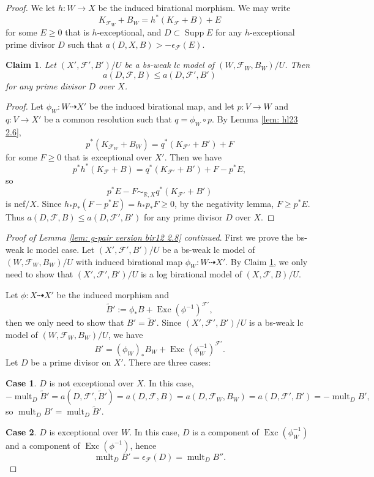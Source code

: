 \documentclass[11pt]{amsart}
\numberwithin{equation}{section}
\newcommand{\Rr}{\mathbb{R}}
\newcommand{\Exc}{\operatorname{Exc}}
\newcommand{\Supp}{\operatorname{Supp}}
\newcommand{\mult}{\operatorname{mult}}
\newcommand{\Ff}{\mathcal{F}}
\newtheorem{claim}[thm]{Claim}
\theoremstyle{definition}
\theoremstyle{definition}
\theoremstyle{definition}
\begin{document}
\begin{proof}
We let $h: W\rightarrow X$ be the induced birational morphism. We may write
$$K_{\Ff_W}+B_W=h^*(K_{\Ff}+B)+E$$
for some $E\geq 0$ that is $h$-exceptional, and $D\subset\Supp E$ for any $h$-exceptional prime divisor $D$ such that $a(D,X,B)>-\epsilon_{\Ff}(E)$.

\begin{claim}\label{claim: log smooth model log discrepancy compare}
Let $(X',\Ff',B')/U$ be a bs-weak lc model of $(W,\Ff_W,B_W)/U$. Then $$a(D,\Ff,B)\leq a(D,\Ff',B')$$ for any prime divisor $D$ over $X$.
\end{claim}
\begin{proof}
Let $\phi_W: W\dashrightarrow X'$ be the induced birational map, and let $p: V\rightarrow W$ and $q: V\rightarrow X'$ be a common resolution such that $q=\phi_W\circ p$. By Lemma \ref{lem: hl23 2.6},
$$p^*(K_{\Ff_W}+B_W)=q^*(K_{\Ff'}+B')+F$$
for some $F\geq 0$ that is exceptional over $X'$. Then we have
$$p^*h^*(K_{\Ff}+B)=q^*(K_{\Ff'}+B')+F-p^*E,$$
so
$$p^*E-F\sim_{\Rr,X}q^*(K_{\Ff'}+B')$$
is nef$/X$. Since $h_*p_*(F-p^*E)=h_*p_*F\geq 0$, by the negativity lemma, $F\geq p^*E$. Thus $a(D,\Ff,B)\leq a(D,\Ff',B')$ for any prime divisor $D$ over $X$.
\end{proof}

\noindent\textit{Proof of Lemma \ref{lem: g-pair version bir12 2.8} continued}. First we prove the bs-weak lc model case. Let $(X',\Ff',B')/U$ be a bs-weak lc model of $(W,\Ff_W,B_W)/U$ with induced birational map $\phi_W: W\dashrightarrow X'$.  By Claim \ref{claim: log smooth model log discrepancy compare}, we only need to show that $(X',\Ff',B')/U$ is a log birational model of $(X,\Ff,B)/U$. 

Let $\phi: X\dashrightarrow X'$ be the induced morphism and 
$$\tilde B':=\phi_*B+\Exc(\phi^{-1})^{\Ff'},$$ then we only need to show that $B'=\tilde B'$. Since  $(X',\Ff',B')/U$ is a bs-weak lc model of $(W,\Ff_W,B_W)/U$, we have
$$B'=(\phi_W)_*B_W+\Exc(\phi_W^{-1})^{\Ff'}.$$ 
Let $D$ be a prime divisor on $X'$. There are three cases:

\medskip

\noindent\textbf{Case 1}. $D$ is not exceptional over $X$. In this case,
    $$-\mult_D\tilde B'=a(D,\Ff',\tilde B')=a(D,\Ff,B)=a(D,\Ff_W,B_W)=a(D,\Ff',B')=-\mult_DB',$$
so $\mult_DB'=\mult_D\tilde B'$.

\medskip

\noindent\textbf{Case 2}. $D$ is exceptional over $W$. In this case, $D$ is a component of $\Exc(\phi_W^{-1})$ and a component of $\Exc(\phi^{-1})$, hence
$$\mult_DB'=\epsilon_{\Ff}(D)=\mult_DB''.$$


\end{proof}
\end{document}
